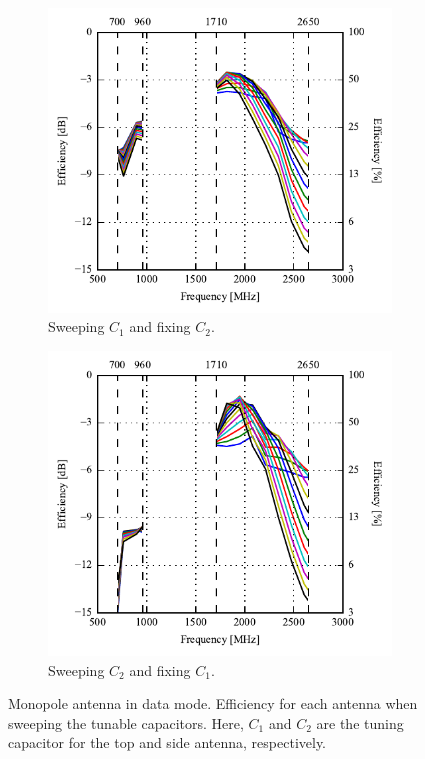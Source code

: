 \begin{figure}[htbp]
    \centering
    \begin{subfigure}{0.49\linewidth}
        \includegraphics{img/tech_sol/monopole/data_mode/efficiency-ac1-csh1}
        \caption{Sweeping $C_1$ and fixing $C_2$.}
    \end{subfigure}
    \hfill
    \begin{subfigure}{0.49\linewidth}
        \includegraphics{img/tech_sol/monopole/data_mode/efficiency-ac2-csh2}
        \caption{Sweeping $C_2$ and fixing $C_1$.}
    \end{subfigure}
    \caption{Monopole antenna in data mode. Efficiency for each antenna when sweeping the tunable capacitors. Here, $C_1$ and $C_2$ are the tuning capacitor for the top and side antenna, respectively.}
    \label{fig:eff_sol1_data}
\end{figure}

